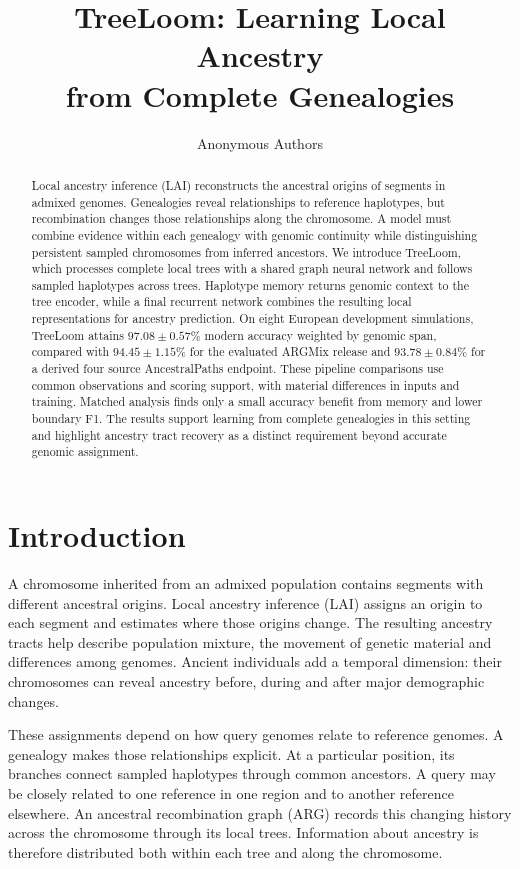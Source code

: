 \documentclass[letterpaper]{article}
\title{TreeLoom: Learning Local Ancestry\\from Complete Genealogies}
\author{Anonymous Authors}
\begin{document}
\maketitle

\begin{abstract}
Local ancestry inference (LAI) reconstructs the ancestral origins of segments in admixed genomes. Genealogies reveal relationships to reference haplotypes, but recombination changes those relationships along the chromosome. A model must combine evidence within each genealogy with genomic continuity while distinguishing persistent sampled chromosomes from inferred ancestors. We introduce TreeLoom, which processes complete local trees with a shared graph neural network and follows sampled haplotypes across trees. Haplotype memory returns genomic context to the tree encoder, while a final recurrent network combines the resulting local representations for ancestry prediction. On eight European development simulations, TreeLoom attains $97.08\pm0.57\%$ modern accuracy weighted by genomic span, compared with $94.45\pm1.15\%$ for the evaluated ARGMix release and $93.78\pm0.84\%$ for a derived four source AncestralPaths endpoint. These pipeline comparisons use common observations and scoring support, with material differences in inputs and training. Matched analysis finds only a small accuracy benefit from memory and lower boundary F1. The results support learning from complete genealogies in this setting and highlight ancestry tract recovery as a distinct requirement beyond accurate genomic assignment.
\end{abstract}

\section{Introduction}
A chromosome inherited from an admixed population contains segments with different ancestral origins. Local ancestry inference (LAI) assigns an origin to each segment and estimates where those origins change. The resulting ancestry tracts help describe population mixture, the movement of genetic material and differences among genomes. Ancient individuals add a temporal dimension: their chromosomes can reveal ancestry before, during and after major demographic changes.

These assignments depend on how query genomes relate to reference genomes. A genealogy makes those relationships explicit. At a particular position, its branches connect sampled haplotypes through common ancestors. A query may be closely related to one reference in one region and to another reference elsewhere. An ancestral recombination graph (ARG) records this changing history across the chromosome through its local trees. Information about ancestry is therefore distributed both within each tree and along the chromosome.
\end{document}
